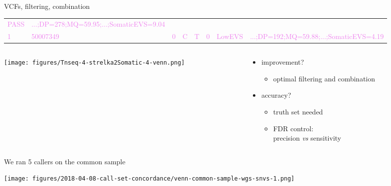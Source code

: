 \documentclass{beamer}
\begin{document}
\begin{frame}{VCFs, filtering, combination}
\begin{tabular}{llllllll}
\textcolor{violet}{PASS} &
\textcolor{violet}{...;DP=278;MQ=59.95;...;SomaticEVS=9.04} \\
\textcolor{violet}{1} &
\textcolor{violet}{50007349} &
\textcolor{violet}{0} &
\textcolor{violet}{C} &
\textcolor{violet}{T} &
\textcolor{violet}{0} &
\textcolor{violet}{LowEVS} &
\textcolor{violet}{...;DP=192;MQ=59.88;...;SomaticEVS=4.19} \\
\end{tabular}
\normalsize
\begin{columns}[]
\begin{column}{0.5\textwidth}

\texttt{[image: figures/Tnseq-4-strelka2Somatic-4-venn.png]}
\end{column}

\begin{column}{0.5\textwidth}
{
\begin{itemize}
\item improvement?
\begin{itemize}
\item optimal filtering and combination
\end{itemize}
\item accuracy?
\begin{itemize}
\item truth set needed
\item FDR control:\\precision \textit{vs} sensitivity 
\end{itemize}
\end{itemize}
}
\end{column}
\end{columns}
\end{frame}

\begin{frame}{We ran 5 callers on the common sample}
\begin{center}
\texttt{[image: figures/2018-04-08-call-set-concordance/venn-common-sample-wgs-snvs-1.png]}
\end{center}
\end{frame}
\end{document}
